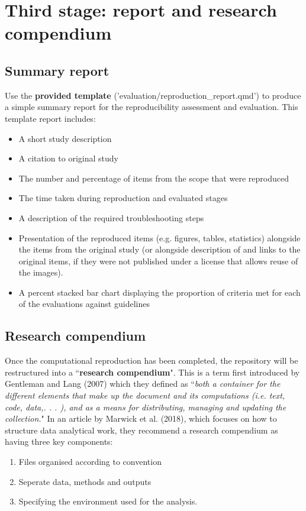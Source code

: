\section{Third stage: report and research compendium}

\subsection{Summary report} \label{sec:report}

Use the \textbf{provided template} ('evaluation/reproduction\_report.qmd') to produce a simple summary report for the reproducibility assessment and evaluation. This template report includes:

\begin{itemize}
    \item A short study description
    \item A citation to original study
    \item The number and percentage of items from the scope that were reproduced
    \item The time taken during reproduction and evaluated stages
    \item A description of the required troubleshooting steps
    \item Presentation of the reproduced items (e.g. figures, tables, statistics) alongside the items from the original study (or alongside description of and links to the original items, if they were not published under a license that allows reuse of the images).
    \item A percent stacked bar chart displaying the proportion of criteria met for each of the evaluations against guidelines
\end{itemize}

\vspace{0.5cm}
\subsection{Research compendium} \label{sec:compendium}

Once the computational reproduction has been completed, the repository will be restructured into a ``\textbf{research compendium}". This is a term first introduced by Gentleman and Lang (2007)\autocite{gentleman_statistical_2007} which they defined as ``\textit{both a container for the different elements that make up the document and its computations (i.e. text, code, data,. . . ), and as a means for distributing, managing and updating the collection.}"\autocite{gentleman_statistical_2007} In an article by Marwick et al. (2018),\autocite{marwick_packaging_2018} which focuses on how to structure data analytical work, they recommend a research compendium as having three key components:
\begin{enumerate}
    \item Files organised according to convention
    \item Seperate data, methods and outputs
    \item Specifying the environment used for the analysis.\autocite{marwick_packaging_2018}
\end{enumerate}

